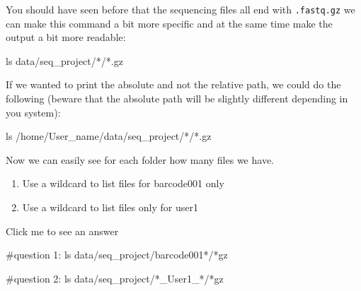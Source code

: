 \documentclass[
  letterpaper,
  DIV=11,
  numbers=noendperiod]{scrreprt}
\newenvironment{Shaded}{}{}
\newcommand{\CommentTok}[1]{\textcolor[rgb]{0.42,0.45,0.49}{#1}}
\newcommand{\FunctionTok}[1]{\textcolor[rgb]{0.44,0.26,0.76}{#1}}
\newcommand{\NormalTok}[1]{\textcolor[rgb]{0.14,0.16,0.18}{#1}}
\newcommand{\PreprocessorTok}[1]{\textcolor[rgb]{0.84,0.23,0.29}{#1}}
\providecommand{\tightlist}{%
  \setlength{\itemsep}{0pt}\setlength{\parskip}{0pt}}\usepackage{longtable,booktabs,array}
\begin{document}
You should have seen before that the sequencing files all end with
\texttt{.fastq.gz} we can make this command a bit more specific and at
the same time make the output a bit more readable:

\begin{Shaded}
\begin{Highlighting}[]
\FunctionTok{ls}\NormalTok{ data/seq\_project/}\PreprocessorTok{*}\NormalTok{/}\PreprocessorTok{*}\NormalTok{.gz}
\end{Highlighting}
\end{Shaded}

If we wanted to print the absolute and not the relative path, we could
do the following (beware that the absolute path will be slightly
different depending in you system):

\begin{Shaded}
\begin{Highlighting}[]
\FunctionTok{ls}\NormalTok{ /home/User\_name/data/seq\_project/}\PreprocessorTok{*}\NormalTok{/}\PreprocessorTok{*}\NormalTok{.gz}
\end{Highlighting}
\end{Shaded}

Now we can easily see for each folder how many files we have.

\begin{tcolorbox}[enhanced jigsaw, rightrule=.15mm, colbacktitle=quarto-callout-caution-color!10!white, colframe=quarto-callout-caution-color-frame, colback=white, arc=.35mm, opacitybacktitle=0.6, coltitle=black, bottomtitle=1mm, breakable, bottomrule=.15mm, leftrule=.75mm, titlerule=0mm, title=\textcolor{quarto-callout-caution-color}{\faFire}\hspace{0.5em}{Exercise}, toprule=.15mm, toptitle=1mm, opacityback=0, left=2mm]

\begin{enumerate}
\def\labelenumi{\arabic{enumi}.}
\tightlist
\item
  Use a wildcard to list files for barcode001 only
\item
  Use a wildcard to list files only for user1
\end{enumerate}

Click me to see an answer

\begin{Shaded}
\begin{Highlighting}[]
\CommentTok{\#question 1:}
\FunctionTok{ls}\NormalTok{ data/seq\_project/barcode001}\PreprocessorTok{*}\NormalTok{/}\PreprocessorTok{*}\NormalTok{gz}

\CommentTok{\#question 2:}
\FunctionTok{ls}\NormalTok{ data/seq\_project/}\PreprocessorTok{*}\NormalTok{\_User1\_}\PreprocessorTok{*}\NormalTok{/}\PreprocessorTok{*}\NormalTok{gz}
\end{Highlighting}
\end{Shaded}

\end{tcolorbox}
\end{document}
